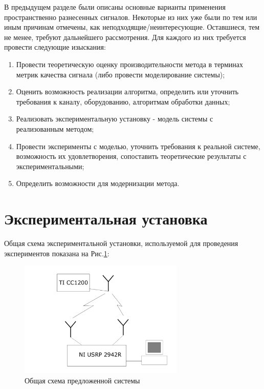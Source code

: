 \documentclass[a4paper,12pt,oneside]{scrartcl}
\begin{document}
В предыдущем разделе были описаны основные варианты применения пространственно разнесенных сигналов. Некоторые из них уже были по тем или иным причинам отмечены, как неподходящие/неинтересующие. Оставшиеся, тем не менее, требуют дальнейшего рассмотрения. 
Для каждого из них требуется провести следующие изыскания:
\begin{enumerate}
\item Провести теоретическую оценку производительности метода в терминах метрик качества сигнала (либо провести моделирование системы);
\item Оценить возможность реализации алгоритма, определить или уточнить требования к каналу, оборудованию, алгоритмам обработки данных;
\item Реализовать экспериментальную установку - модель системы с реализованным методом;
\item Провести эксперименты с моделью, уточнить требования к реальной системе, возможность их удовлетворения, сопоставить теоретические результаты с экспериментальными;
\item Определить возможности для модернизации метода.
\end{enumerate}

\clearpage

\section{Экспериментальная установка}
Общая схема экспериментальной установки, используемой для проведения экспериментов показана на Рис.\ref{fig:SystStructure}:

\begin{figure}[!htb]
    \centering
    \includegraphics[width=0.7\textwidth]{pics/systemstructure.png}
    \caption{Общая схема предложенной системы}
    \label{fig:SystStructure}
\end{figure}
\end{document}

